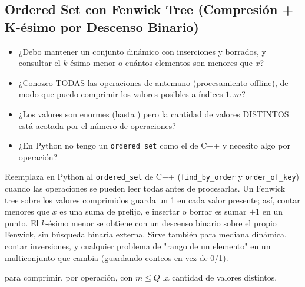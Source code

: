 \subsection{Ordered Set con Fenwick Tree (Compresión + K-ésimo por Descenso Binario)}
\label{alg:3-9}


\begin{itemize}
\item ¿Debo mantener un conjunto dinámico con inserciones y borrados, y consultar el $k$-ésimo menor o cuántos elementos son menores que $x$?
\item ¿Conozco TODAS las operaciones de antemano (procesamiento offline), de modo que puedo comprimir los valores posibles a índices $1..m$?
\item ¿Los valores son enormes (hasta ) pero la cantidad de valores DISTINTOS está acotada por el número de operaciones?
\item ¿En Python no tengo un \texttt{ordered\_set} como el de C++ y necesito algo  por operación?
\end{itemize}

 Reemplaza en Python al \texttt{ordered\_set} de C++ (\texttt{find\_by\_order} y \texttt{order\_of\_key}) cuando las operaciones se pueden leer todas antes de procesarlas. Un Fenwick tree sobre los valores comprimidos guarda un 1 en cada valor presente; así, contar menores que $x$ es una suma de prefijo, e insertar o borrar es sumar $\pm1$ en un punto. El $k$-ésimo menor se obtiene con un descenso binario sobre el propio Fenwick, sin búsqueda binaria externa. Sirve también para mediana dinámica, contar inversiones, y cualquier problema de "rango de un elemento" en un multiconjunto que cambia (guardando conteos en vez de 0/1).

  para comprimir,  por operación, con $m \le Q$ la cantidad de valores distintos.

